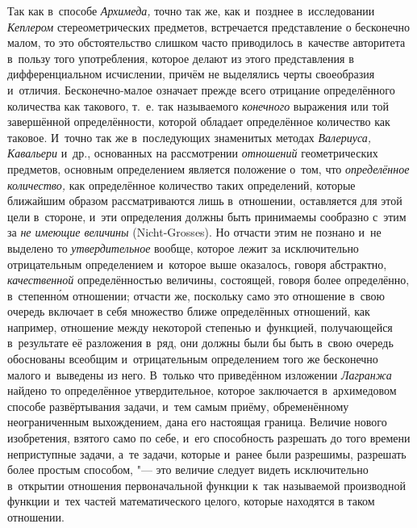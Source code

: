 Так как в~способе {\em Архимеда,} точно так же, как и~позднее в~исследовании
{\em Кеплером} стереометрических предметов, встречается представление о
бесконечно малом, то это обстоятельство слишком часто приводилось в~качестве
авторитета в~пользу того употребления, которое делают из этого представления в
дифференциальном исчислении, причём не выделялись черты своеобразия и~отличия.
Бесконечно-малое означает прежде всего отрицание определённого количества как
такового, т.~е. так называемого {\em конечного} выражения или той завершённой
определённости, которой обладает определённое количество как таковое. И~точно
так же в~последующих знаменитых методах {\em Валериуса, Кавальери} и~др.,
основанных на рассмотрении {\em отношений} геометрических предметов, основным
определением является положение о~том, что {\em определённое количество,} как
определённое количество таких определений, которые ближайшим образом
рассматриваются лишь в~отношении, оставляется для этой цели в~стороне, и~эти
определения должны быть принимаемы сообразно с~этим за {\em не имеющие
величины} (Nicht-Grosses). Но отчасти этим не познано и~не выделено то
{\em утвердительное} вообще, которое лежит за исключительно отрицательным
определением и~которое выше оказалось, говоря абстрактно, {\em качественной}
определённостью величины, состоящей, говоря более определённо, в~степенн\'{о}м
отношении; отчасти же, поскольку само это отношение в~свою очередь включает в
себя множество ближе определённых отношений, как например, отношение между
некоторой степенью и~функцией, получающейся в~результате её разложения в~ряд,
они должны были бы быть в~свою очередь обоснованы всеобщим и~отрицательным
определением того же бесконечно малого и~выведены из него. В~только что
приведённом изложении {\em Лагранжа} найдено то определённое утвердительное,
которое заключается в~архимедовом способе развёртывания задачи, и~тем самым
приёму, обременённому неограниченным выхождением, дана его настоящая граница.
Величие нового изобретения, взятого само по себе, и~его способность разрешать
до того времени неприступные задачи, а~те задачи, которые и~ранее были
разрешимы, разрешать более простым способом, "--- это величие следует видеть
исключительно в~открытии отношения первоначальной функции к~так называемой
производной функции и~тех частей математического целого, которые находятся в
таком отношении.

